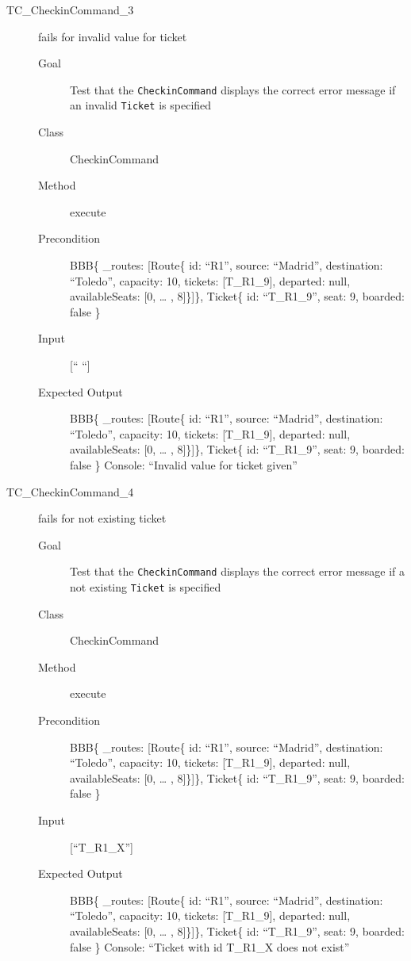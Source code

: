 \documentclass[11pt]{article}
\begin{document}
\begin{description}
\item[{TC\_CheckinCommand\_3}] fails for invalid value for ticket
\begin{description}
\item[{Goal}] Test that the \texttt{CheckinCommand} displays the correct error message if an invalid \texttt{Ticket} is specified
\item[{Class}] CheckinCommand
\item[{Method}] execute
\item[{Precondition}] BBB\{ \_routes: [Route\{ id: “R1”, source: “Madrid”, destination: “Toledo”, capacity: 10,  tickets: [T\_R1\_9], departed: null, availableSeats: [0, … , 8]\}]\}, Ticket\{ id: “T\_R1\_9”, seat: 9, boarded: false \}
\item[{Input}] [“ “]
\item[{Expected Output}] BBB\{ \_routes: [Route\{ id: “R1”, source: “Madrid”, destination: “Toledo”, capacity: 10,  tickets: [T\_R1\_9], departed: null, availableSeats: [0, … , 8]\}]\}, Ticket\{ id: “T\_R1\_9”, seat: 9, boarded: false \}
Console: “Invalid value for ticket given”
\end{description}

\item[{TC\_CheckinCommand\_4}] fails for not existing ticket
\begin{description}
\item[{Goal}] Test that the \texttt{CheckinCommand} displays the correct error message if a not existing \texttt{Ticket} is specified
\item[{Class}] CheckinCommand
\item[{Method}] execute
\item[{Precondition}] BBB\{ \_routes: [Route\{ id: “R1”, source: “Madrid”, destination: “Toledo”, capacity: 10,  tickets: [T\_R1\_9], departed: null, availableSeats: [0, … , 8]\}]\}, Ticket\{ id: “T\_R1\_9”, seat: 9, boarded: false \}
\item[{Input}] [“T\_R1\_X”]
\item[{Expected Output}] BBB\{ \_routes: [Route\{ id: “R1”, source: “Madrid”, destination: “Toledo”, capacity: 10,  tickets: [T\_R1\_9], departed: null, availableSeats: [0, … , 8]\}]\}, Ticket\{ id: “T\_R1\_9”, seat: 9, boarded: false \}
Console: “Ticket with id T\_R1\_X does not exist”
\end{description}
\end{description}
\end{document}
